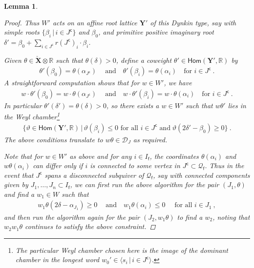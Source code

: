 \documentclass[reqno,a4paper]{amsart}
\newcommand{\calD}{\mathcal{D}}
\newcommand{\R}{\mathbb{R}}
\newcommand{\sff}{\mathsf{f}}
\newcommand{\bfY}{\mathbf{Y}}
\newcommand{\bfX}{\mathbf{X}}
\newcommand{\qvfin}{\mathcal{Q}_\sff}
\newcommand{\rootlattice}{\bfY}
\newcommand{\weightlattice}{\bfX}
\newcommand{\coweightlattice}{\check{\weightlattice}}
\newcommand{\Jcomp}{{J^\mathsf{c}}}
\newcommand{\Hom}{\mathsf{Hom}}
\theoremstyle{basic-theorem}
\newtheorem{lemma}[theorem]{Lemma}
\numberwithin{equation}{section}
\begin{document}
\begin{lemma}
\begin{proof}
        Thus $W'$ acts on an affine root lattice $\rootlattice'$ of this Dynkin
        type, say with simple roots $\{\beta_i\,\vert\,i\in \Jcomp\}$ and
        $\beta_0$, and primitive positive imaginary root $\delta'=\beta_0 +
        \sum_{i\in \Jcomp} r(\Jcomp)_i \cdot  \beta_i$.

        Given $\theta\in \coweightlattice\otimes \R$ such that $\theta(\delta)>0$, define a coweight $\theta'\in \Hom(\rootlattice',\R)$ by
		\begin{align}
			\theta'(\beta_0)=\theta(\alpha_{\Jcomp})\ \quad\text{and}\quad \theta'(\beta_i)=\theta(\alpha_{i}) \quad\text{for }i\in \Jcomp\ .
		\end{align}
        A straightforward computation shows that for $w\in W'$, we have
		\begin{align}
			w\cdot \theta'(\beta_0)=w\cdot \theta(\alpha_{\Jcomp})\ \quad\text{and}\quad w\cdot\theta'(\beta_i)=w\cdot \theta(\alpha_{i}) \quad\text{for }i\in \Jcomp\ .
		\end{align}
        In particular $\theta'(\delta')=\theta(\delta)>0$, so there exists a $w\in W'$ such that $w\theta'$ lies in the Weyl chamber\footnote{The particular Weyl chamber chosen here is the image of the dominant chamber in the longest word $w_0'\in \langle s_{i}\,\vert\, i\in \Jcomp\rangle$.}
		\begin{align}
			\{\vartheta\in \Hom(\rootlattice',\R)\,\vert\, \vartheta(\beta_i)\leq 0 \text{ for all }i\in \Jcomp\;\text{and}\; \vartheta(2\delta'-\beta_0)\geq 0\} \ .
		\end{align}
        The above conditions translate to $w\theta \in \calD_J$ as required.

        Note that for $w\in W'$ as above and for any $i\in I_\sff$, the coordinates $\theta(\alpha_i)$ and $w\theta(\alpha_i)$ can differ only if $i$ is connected to some vertex in $\Jcomp\subset\qvfin$. Thus in the event that $\Jcomp$ spans a disconnected subquiver of $\qvfin$, say with connected components given by $J_1,\ldots,J_n\subset I_\sff$, we can first run the above algorithm for the pair $(J_1,\theta)$ and find a $w_1\in W$ such that
		\begin{align}
			w_1\theta(2\delta-\alpha_{J_1})\geq 0\ \quad\text{and}\quad
            w_1\theta (\alpha_i)\leq 0 \quad \text{ for all } i\in J_1\ ,
		\end{align}
        and then run the algorithm again for the pair $(J_2,w_1\theta)$ to find a $w_2$, noting that $w_2w_1\theta$ continues to satisfy the above constraint.
    \end{proof}
\end{lemma}
\end{document}
